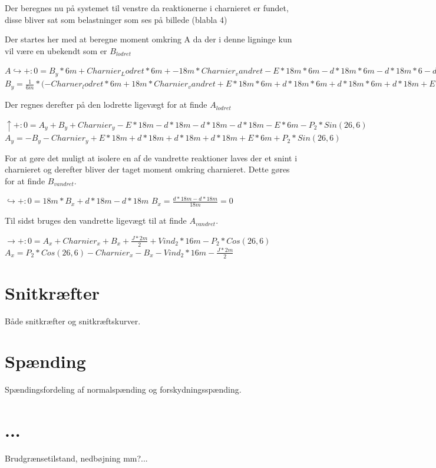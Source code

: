 Der beregnes nu på systemet til venstre da reaktionerne i charnieret er fundet, disse bliver sat som belastninger som ses på billede (blabla 4)


Der startes her med at beregne moment omkring A da der i denne ligninge kun vil være en ubekendt som er $B_{lodret}$  
\begin{center}
	$A\hookrightarrow+:0=B_y*6m+Charnier_Lodret*6m+-18m*Charnier_vandret-E*18m*6m-d*18m*6m-d*18m*6-d-18m-E*6m*\frac{6}{2}+P_2*Cos(26,\!6)*18m-Vind_2*18m*(\frac{16}{2}m+2m)-\frac{J*2m}{2}*(\frac{2m}{2})$
	$B_y=\frac{1}{6m}*(-Charner_lodret*6m+18m*Charnier_vandret+E*18m*6m+d*18m*6m+d*18m*6m+d*18m+E*6m*\frac{6}{2}m-P_2*Cos(26,\!6)*18m+Vind_2*18m*(8m+2m+\frac{J*2m}{2}*\frac{2m}{2})$
\end{center}

Der regnes derefter på den lodrette ligevægt for at finde $A_{lodret}$
\begin{center}
	$\uparrow+:0=A_y+B_y+Charnier_y-E*18m-d*18m-d*18m-d*18m-E*6m-P_2*Sin(26,\!6)$
	$A_y=-B_y-Charnier_y+E*18m+d*18m+d*18m+d*18m+E*6m+P_2*Sin(26,\!6)$
\end{center}

For at gøre det muligt at isolere en af de vandrette reaktioner laves der et snint i charnieret og derefter bliver der taget moment omkring charnieret. Dette gøres for at finde $B_{vandret}$.
\begin{center}
	$\hookrightarrow+:0=18m*B_x+d*18m-d*18m$
	$B_x=\frac{d*18m-d*18m}{18m}=0$
\end{center}

Til sidst bruges den vandrette ligevægt til at finde $A_{vandret}$.
\begin{center}
	$\rightarrow+:0=A_x+Charnier_x+B_x+\frac{J*2m}{2}+Vind_2*16m-P_2*Cos(26,\!6)$
	$A_x=P_2*Cos(26,\!6)-Charnier_x-B_x-Vind_2*16m-\frac{J*2m}{2}$
\end{center} 
 
\section{Snitkræfter}
Både snitkræfter og snitkræftskurver.

\section{Spænding}
Spændingsfordeling af normalspænding og forskydningsspænding.

\section{...}
Brudgrænsetilstand, nedbøjning mm?...